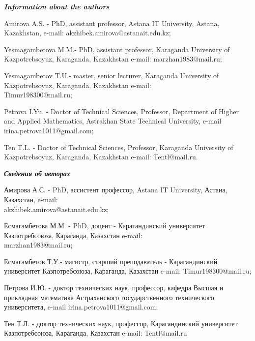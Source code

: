 \begin{authorinfo}
\hspace{1em}\emph{{\bfseries Information about the authors}}

Amirova A.S. - PhD, assistant professor, Astana IT University, Astana,
Kazakhstan, e-mail: akzhibek.amirova@astanait.edu.kz;

Yesmagambetova M.M.- PhD, assistant professor, Karaganda University of
Kazpotrebsoyuz, Karaganda, Kazakhstan e-mail: marzhan1983@mail.ru;

Yesmagambetov T.U.- master, senior lecturer, Karaganda University of
Kazpotrebsoyuz, Karaganda, Kazakhstan e-mail: \\Timur198300@mail.ru;

Petrova I.Yu. - Doctor of Technical Sciences, Professor, Department of
Higher and Applied Mathematics, Astrakhan State Technical University,
e-mail irina.petrova1011@gmail.com;

Ten T.L. - Doctor of Technical Sciences, Professor, Karaganda University
of Kazpotrebsoyuz, Karaganda, Kazakhstan e-mail: Tentl@mail.ru.

\hspace{1em}\emph{{\bfseries Сведения об авторах}}

Амирова А.С. - PhD, ассистент профессор, Astana IT University, Астана,
Казахстан, e-mail: \\akzhibek.amirova@astanait.edu.kz;

Есмагамбетова М.М. - PhD, доцент - Карагандинский университет
Казпотребсоюза, Караганда, Казахстан e-mail: \\marzhan1983@mail.ru;

Есмагамбетов Т.У.- магистр, старший преподаватель - Карагандинский
университет Казпотребсоюза, Караганда, Казахстан e-mail: Timur198300@mail.ru;

Петрова И.Ю. - доктор технических наук, профессор, кафедра Высшая и
прикладная математика Астраханского государственного
технического университета, e-mail irina.petrova1011@gmail.com;

Тен Т.Л. - доктор технических наук, профессор, Карагандинский
университет Казпотребсоюза, Караганда, Казахстан e-mail: Tentl@mail.ru
\end{authorinfo}
